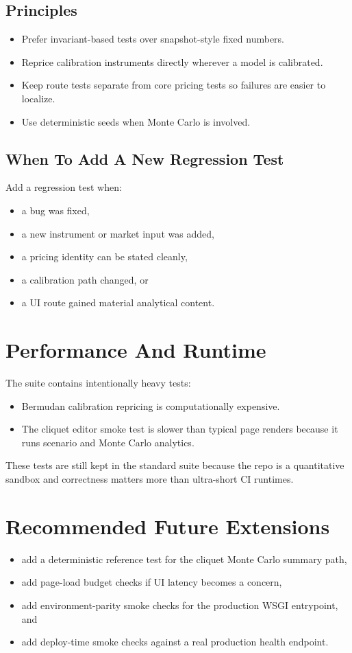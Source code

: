 \documentclass[11pt]{article}
\begin{document}
\subsection{Principles}
\begin{itemize}[leftmargin=1.5em]
    \item Prefer invariant-based tests over snapshot-style fixed numbers.
    \item Reprice calibration instruments directly wherever a model is calibrated.
    \item Keep route tests separate from core pricing tests so failures are easier to localize.
    \item Use deterministic seeds when Monte Carlo is involved.
\end{itemize}

\subsection{When To Add A New Regression Test}
Add a regression test when:
\begin{itemize}[leftmargin=1.5em]
    \item a bug was fixed,
    \item a new instrument or market input was added,
    \item a pricing identity can be stated cleanly,
    \item a calibration path changed, or
    \item a UI route gained material analytical content.
\end{itemize}

\section{Performance And Runtime}
The suite contains intentionally heavy tests:
\begin{itemize}[leftmargin=1.5em]
    \item Bermudan calibration repricing is computationally expensive.
    \item The cliquet editor smoke test is slower than typical page renders because it runs scenario and Monte Carlo analytics.
\end{itemize}
These tests are still kept in the standard suite because the repo is a quantitative sandbox and correctness matters more than ultra-short CI runtimes.

\section{Recommended Future Extensions}
\begin{itemize}[leftmargin=1.5em]
    \item add a deterministic reference test for the cliquet Monte Carlo summary path,
    \item add page-load budget checks if UI latency becomes a concern,
    \item add environment-parity smoke checks for the production WSGI entrypoint, and
    \item add deploy-time smoke checks against a real production health endpoint.
\end{itemize}
\end{document}
